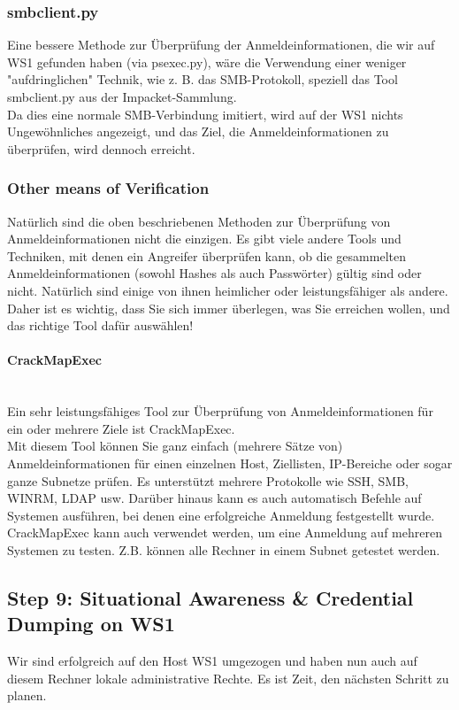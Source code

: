\subsubsection{smbclient.py}
Eine bessere Methode zur Überprüfung der Anmeldeinformationen, die wir auf WS1 gefunden haben (via psexec.py), wäre die Verwendung einer weniger "aufdringlichen" Technik, wie z. B. das SMB-Protokoll, speziell das Tool smbclient.py aus der Impacket-Sammlung.\\

Da dies eine normale SMB-Verbindung imitiert, wird auf der WS1 nichts Ungewöhnliches angezeigt, und das Ziel, die Anmeldeinformationen zu überprüfen, wird dennoch erreicht.

\subsubsection{Other means of Verification}
Natürlich sind die oben beschriebenen Methoden zur Überprüfung von Anmeldeinformationen nicht die einzigen. Es gibt viele andere Tools und Techniken, mit denen ein Angreifer überprüfen kann, ob die gesammelten Anmeldeinformationen (sowohl Hashes als auch Passwörter) gültig sind oder nicht. Natürlich sind einige von ihnen heimlicher oder leistungsfähiger als andere. Daher ist es wichtig, dass Sie sich immer überlegen, was Sie erreichen wollen, und das richtige Tool dafür auswählen!

\paragraph{CrackMapExec}\mbox{} \\
Ein sehr leistungsfähiges Tool zur Überprüfung von Anmeldeinformationen für ein oder mehrere Ziele ist CrackMapExec.\\

Mit diesem Tool können Sie ganz einfach (mehrere Sätze von) Anmeldeinformationen für einen einzelnen Host, Ziellisten, IP-Bereiche oder sogar ganze Subnetze prüfen. Es unterstützt mehrere Protokolle wie SSH, SMB, WINRM, LDAP usw. Darüber hinaus kann es auch automatisch Befehle auf Systemen ausführen, bei denen eine erfolgreiche Anmeldung festgestellt wurde.\\

CrackMapExec kann auch verwendet werden, um eine Anmeldung auf mehreren Systemen zu testen. Z.B. können alle Rechner in einem Subnet getestet werden.



\subsection{Step 9: Situational Awareness \& Credential Dumping on WS1}
Wir sind erfolgreich auf den Host WS1 umgezogen und haben nun auch auf diesem Rechner lokale administrative Rechte. Es ist Zeit, den nächsten Schritt zu planen.

